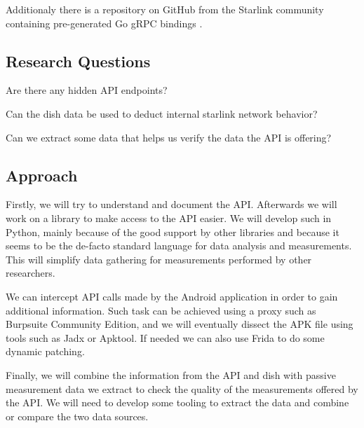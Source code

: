 \documentclass[NET,a4paper,12pt,english]{netforms}
\begin{document}
Additionaly there is a repository on GitHub from the Starlink community containing pre-generated Go gRPC bindings \cite{starlink-grpc-go}.

\subsection*{Research Questions}
\begin{researchquestions}
\item Are there any hidden API endpoints?
\item Can the dish data be used to deduct internal starlink network behavior?
\item Can we extract some data that helps us verify the data the API is offering?
\end{researchquestions}

\subsection*{Approach}
Firstly, we will try to understand and document the API.
Afterwards we will work on a library to make access to the API easier.
We will develop such in Python, mainly because of the good support by other libraries and because it seems to be the de-facto standard language
for data analysis and measurements. This will simplify data gathering for measurements performed by other researchers.

We can intercept API calls made by the Android application in order to gain additional information.
Such task can be achieved using a proxy such as Burpsuite Community Edition, and we will eventually dissect the APK file
using tools such as Jadx or Apktool. If needed we can also use Frida to do some dynamic patching.

Finally, we will combine the information from the API and dish with passive measurement data we extract to check the quality of the measurements offered by the API.
We will need to develop some tooling to extract the data and combine or compare the two data sources.
\end{document}
